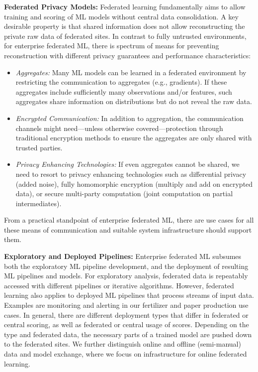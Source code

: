 \documentclass[sigconf,screen]{acmart}
\begin{document}
\textbf{Federated Privacy Models:} Federated learning fundamentally aims to allow training and scoring of ML models without central data consolidation. A key desirable property is that shared information does not allow reconstructing the private raw data of federated sites. In contrast to fully untrusted environments, for enterprise federated ML, there is spectrum of means for preventing reconstruction with different privacy guarantees and performance characteristics:
\begin{itemize}
\item \emph{Aggregates:} Many ML models can be learned in a federated environment by restricting the communication to aggregates (e.g., gradients). If these aggregates include sufficiently many observations and/or features, such aggregates share information on distributions but do not reveal the raw data.
\item \emph{Encrypted Communication:} In addition to aggregation, the communication channels might need---unless otherwise covered---protection through traditional encryption methods to ensure the aggregates are only shared with trusted parties.
\item \emph{Privacy Enhancing Technologies:} If even aggregates cannot be shared, we need to resort to privacy enhancing technologies such as differential privacy \cite{JiLE14} (added noise), fully homomorphic encryption \cite{Gentry09,AcarAUC18,GiladBachrachD16} (multiply and add on encrypted data), or secure multi-party computation \cite{MohasselZ17} (joint computation on partial intermediates).
\end{itemize}
From a practical standpoint of enterprise federated ML, there are use cases for all these means of communication and suitable system infrastructure should support them. %

\textbf{Exploratory and Deployed Pipelines:} Enterprise federated ML subsumes both the exploratory ML pipeline development, and the deployment of resulting ML pipelines and models. For exploratory analysis, federated data is repeatably accessed with different pipelines or iterative algorithms. However, federated learning also applies to deployed ML pipelines that process streams of input data. Examples are monitoring and alerting in our fertilizer and paper production use cases. In general, there are different deployment types that differ in federated or central scoring, as well as federated or central usage of scores. Depending on the type and federated data, the necessary parts of a trained model are pushed down to the federated sites. We further distinguish online and offline (semi-manual) data and model exchange, where we focus on infrastructure for online federated learning.
\end{document}

